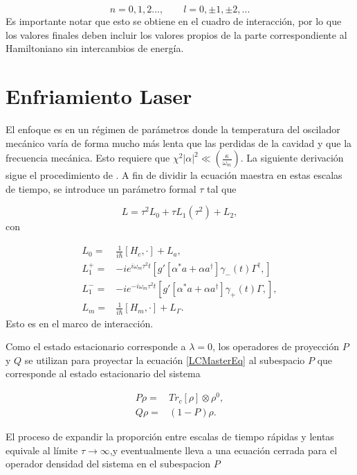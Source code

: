 \documentclass[10pt,a4paper]{report}
\begin{document}
\begin{equation}
n=0,1,2...,\qquad l = 0,\pm 1, \pm 2,... 
\end{equation}Es importante notar que esto se obtiene en el cuadro de interacción, por lo que los valores finales deben incluir los valores propios de la parte correspondiente al Hamiltoniano sin intercambios de energía. 
 

\section{Enfriamiento Laser}\label{LasCool}

El enfoque es en un régimen de parámetros donde la temperatura del oscilador mecánico varía de forma mucho más lenta que las perdidas de la cavidad y que la frecuencia mecánica. Esto requiere que $\chi^2 |\alpha|^2 \ll (\frac{\kappa}{\omega_m})$. La siguiente derivación sigue el procedimiento de  \cite{LCNooshi}. A fin de dividir la ecuación maestra en estas escalas de tiempo, se introduce un parámetro formal $\tau$ tal que

 
\begin{equation}
L = \tau^2 L_0 + \tau L_1(\tau^2) + L_2,
\end{equation} con

\begin{align*}
L_0 =& \frac{1}{i\hbar}[H_c,\cdot] + L_a,\\
L_1^+ =& -ie^{i\omega_m \tau^2 t}[g'[\alpha^* a + \alpha a^\dagger]\gamma_-(t)\Gamma^\dagger,]\\
L_1^- =&-ie^{-i\omega_m \tau^2 t}[g'[\alpha^* a + \alpha a^\dagger]\gamma_+(t)\Gamma,],\\
L_m =& \frac{1}{i\hbar}[H_m,\cdot] + L_\Gamma.
\end{align*}Esto es en el marco de interacción.

Como el estado estacionario corresponde a $\lambda = 0$\cite{EnglertDB}, los operadores de proyección $P$ y $Q$ se utilizan para proyectar la ecuación \eqref{LCMasterEq} al subespacio $P$ que corresponde al estado estacionario del sistema


\begin{align}
P\rho=&Tr_c[\rho]\otimes \rho^{0}, \\
Q\rho=&(1-P)\rho.
\end{align}

El proceso de expandir la proporción entre escalas de tiempo rápidas y lentas equivale al límite $\tau \rightarrow \infty$,y eventualmente lleva a una ecuación  cerrada para el operador densidad del sistema en el subespacion $P$
\end{document}

